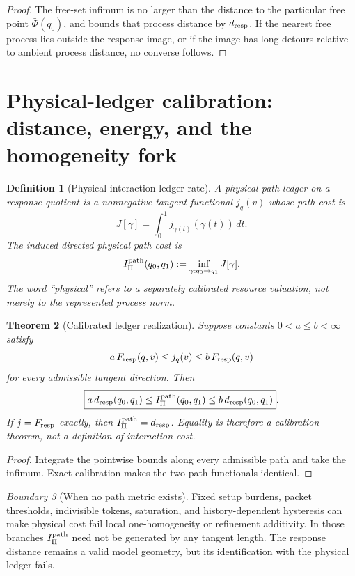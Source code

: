 \documentclass[11pt]{article}
\newtheorem{theorem}{Theorem}[section]
\newtheorem{definition}[theorem]{Definition}
\theoremstyle{remark}
\newtheorem{warning}[theorem]{Boundary}
\newcommand{\Fresp}{F_{\rm resp}}
\newcommand{\dresp}{d_{\rm resp}}
\begin{document}
\begin{proof}
The free-set infimum is no larger than the distance to the particular free point $\bar\Phi(q_0)$, and  bounds that process distance by $\dresp$.  If the nearest free process lies outside the response image, or if the image has long detours relative to ambient process distance, no converse follows.
\end{proof}

\section{Physical-ledger calibration: distance, energy, and the homogeneity fork}
\label{sec:ledger-calibration}

\begin{definition}[Physical interaction-ledger rate]
A physical path ledger on a response quotient is a nonnegative tangent functional $j_q(v)$ whose path cost is
\[
        J[\gamma]=\int_0^1 j_{\gamma(t)}(\dot\gamma(t))\,dt.
\]
The induced directed physical path cost is
\[
        I_\Pi^{\rm path}(q_0,q_1)
        :=\inf_{\gamma:q_0\to q_1}J[\gamma].
\]
The word ``physical'' refers to a separately calibrated resource valuation, not merely to the represented process norm.
\end{definition}

\begin{theorem}[Calibrated ledger realization]
\label{thm:ledger-calibration}
Suppose constants $0<a\le b<\infty$ satisfy
\[
        a\,\Fresp(q,v)
        \le j_q(v)
        \le b\,\Fresp(q,v)
\]
for every admissible tangent direction.  Then
\[
        \boxed{
        a\,\dresp(q_0,q_1)
        \le I_\Pi^{\rm path}(q_0,q_1)
        \le b\,\dresp(q_0,q_1)
        }.
\]
If $j=\Fresp$ exactly, then $I_\Pi^{\rm path}=\dresp$.  Equality is therefore a calibration theorem, not a definition of interaction cost.
\end{theorem}

\begin{proof}
Integrate the pointwise bounds along every admissible path and take the infimum.  Exact calibration makes the two path functionals identical.
\end{proof}

\begin{warning}[When no path metric exists]
Fixed setup burdens, packet thresholds, indivisible tokens, saturation, and history-dependent hysteresis can make physical cost fail local one-homogeneity or refinement additivity.  In those branches $I_\Pi^{\rm path}$ need not be generated by any tangent length.  The response distance remains a valid model geometry, but its identification with the physical ledger fails.
\end{warning}
\end{document}
